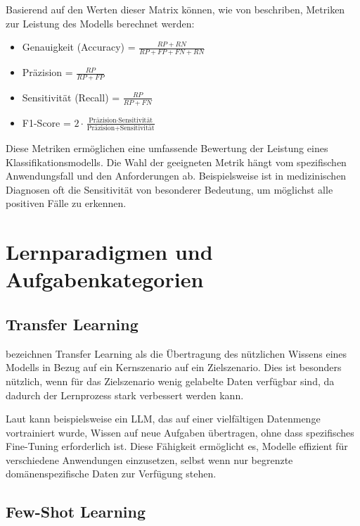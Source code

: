 Basierend auf den Werten dieser Matrix können, wie von \textcite{PowersDavidM.W2020Efpr} beschriben, Metriken zur Leistung des Modells berechnet werden:

\begin{itemize}
	\item Genauigkeit (Accuracy) = $\frac{RP + RN}{RP + FP + FN + RN}$
	\item Präzision = $\frac{RP}{RP + FP}$
	\item Sensitivität (Recall) = $\frac{RP}{RP + FN}$
	\item F1-Score = $2 \cdot \frac{\text{Präzision} \cdot \text{Sensitivität}}{\text{Präzision} + \text{Sensitivität}}$
\end{itemize}

Diese Metriken ermöglichen eine umfassende Bewertung der Leistung eines Klassifikationsmodells. Die Wahl der geeigneten Metrik hängt vom spezifischen Anwendungsfall und den Anforderungen ab. Beispielsweise ist in medizinischen Diagnosen oft die Sensitivität von besonderer Bedeutung, um möglichst alle positiven Fälle zu erkennen.

\section{Lernparadigmen und Aufgabenkategorien}
\label{sec:lernparadigmen-aufgabenkategorien}

\subsection{Transfer Learning}
\label{subsec:transfer-learning}

\textcite{PanSinnoJialin2010ASoT} bezeichnen Transfer Learning als die Übertragung des nützlichen Wissens eines Modells in Bezug auf ein Kernszenario auf ein Zielszenario. Dies ist besonders nützlich, wenn für das Zielszenario wenig gelabelte Daten verfügbar sind, da dadurch der Lernprozess stark verbessert werden kann.

Laut \textcite{BrownTomB2020LMaF} kann beispielsweise ein \gls{LLM}, das auf einer vielfältigen Datenmenge vortrainiert wurde, Wissen auf neue Aufgaben übertragen, ohne dass spezifisches Fine-Tuning erforderlich ist. Diese Fähigkeit ermöglicht es, Modelle effizient für verschiedene Anwendungen einzusetzen, selbst wenn nur begrenzte domänenspezifische Daten zur Verfügung stehen.

\subsection{Few-Shot Learning}
\label{subsec:few-shot-learning}

